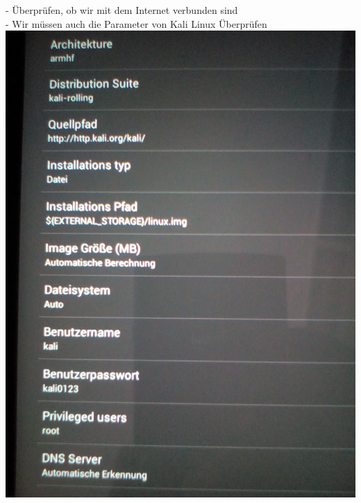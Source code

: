\documentclass[11pt,a4paper]{article}
\begin{document}
- Überprüfen, ob wir mit dem Internet verbunden sind \\
- Wir müssen auch die Parameter von Kali Linux Überprüfen \\ 
\includegraphics[scale=0.09]{./Image/img2} \\ \\
\end{document}
